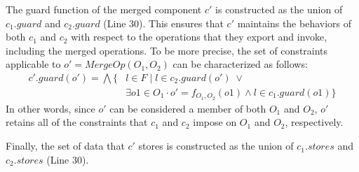 The guard function of the merged component $c'$ is constructed
as the union of $c_{1}.guard$ and $c_{2}.guard$ (Line 30). This ensures that $c'$
maintains the behaviors of both $c_{1}$ and $c_{2}$ with respect to the
operations that they export and invoke, including the merged
operations. To be more precise, the set of constraints applicable to $o' =
MergeOp(O_{1}, O_{2})$ can be characterized as follows:
\begin{align*}
c'.guard(o') = \bigwedge \{& l \in F \;|\; l \in c_{2}.guard(o') \; \lor \\
&\exists o1 \in O_{1} 
\cdot o' = f_{O_{1}, O_{2}}(o1) \land l \in c_{1}.guard(o1) \} 
\end{align*}
In other words, since $o'$ can be considered a member of both $O_{1}$ and
$O_{2}$, $o'$ retains all of the constraints that $c_{1}$ and $c_{2}$ impose
on $O_{1}$ and $O_{2}$, respectively. 

Finally, the set of data that $c'$ stores is constructed as the union
of $c_{1}.stores$ and $c_{2}.stores$ (Line 30).





